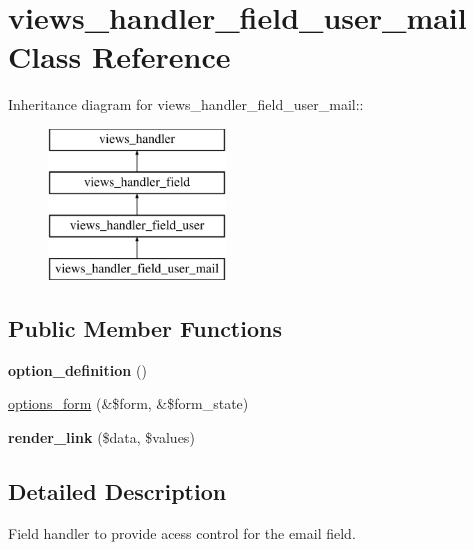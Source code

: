 \hypertarget{classviews__handler__field__user__mail}{
\section{views\_\-handler\_\-field\_\-user\_\-mail Class Reference}
\label{classviews__handler__field__user__mail}
}
Inheritance diagram for views\_\-handler\_\-field\_\-user\_\-mail::\begin{figure}[H]
\begin{center}
\leavevmode
\includegraphics[height=4cm]{classviews__handler__field__user__mail}
\end{center}
\end{figure}
\subsection*{Public Member Functions}
\begin{DoxyCompactItemize}
\item 
\hypertarget{classviews__handler__field__user__mail_a747c64da5c9bdbd55c7a8908779db5a1}{
{\bfseries option\_\-definition} ()}
\label{classviews__handler__field__user__mail_a747c64da5c9bdbd55c7a8908779db5a1}

\item 
\hyperlink{classviews__handler__field__user__mail_aee55735f96178173853dbf1f8b293216}{options\_\-form} (\&\$form, \&\$form\_\-state)
\item 
\hypertarget{classviews__handler__field__user__mail_a886a46fc4b592f00e3712ae587343cec}{
{\bfseries render\_\-link} (\$data, \$values)}
\label{classviews__handler__field__user__mail_a886a46fc4b592f00e3712ae587343cec}

\end{DoxyCompactItemize}


\subsection{Detailed Description}
Field handler to provide acess control for the email field. 

